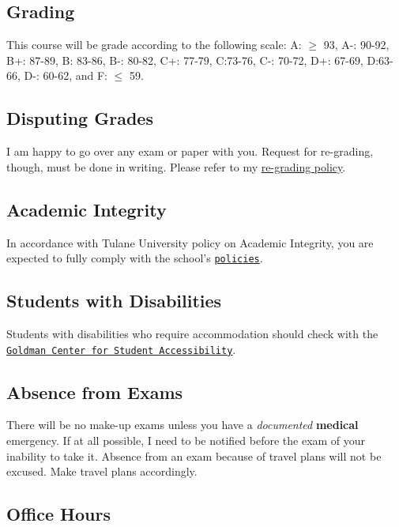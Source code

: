 \documentclass[letterpaper]{article}
\begin{document}
\subsection*{Grading}

This course will be grade according to the following scale: 
A: $\geq$ 93, A-: 90-92, B+: 87-89, B: 83-86, B-: 80-82, C+: 77-79, C:73-76, C-: 70-72, D+: 67-69, D:63-66, D-: 60-62, and F: $\leq$ 59. 

\subsection*{Disputing Grades}

I am happy to go over any exam or paper with you. Request for re-grading, though, must be done in writing. Please refer to my \href{https://github.com/hbahamonde/hbahamonde.github.io/raw/master/resources/ReGrade_Policy.pdf}{re-grading policy}.



\subsection*{Academic Integrity}
In accordance with Tulane University policy on Academic Integrity, you are expected to fully comply with the school's \href{https://college.tulane.edu/code-of-academic-conduct}{\texttt{policies}}. 


\subsection*{Students with Disabilities}
Students with disabilities who require accommodation should check with the \href{https://accessibility.tulane.edu/}{\texttt{Goldman Center for Student Accessibility}}.


\subsection*{Absence from Exams}


There will be no make-up exams unless you have a \emph{documented} {\bf medical} emergency. If at all possible, I need to be notified before the exam of your inability to take it. Absence from an exam because of travel plans will not be excused. Make travel plans accordingly. 


\subsection*{Office Hours}
\end{document}
